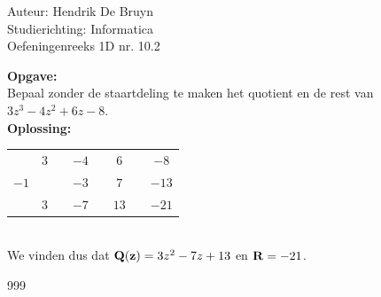 \documentclass[a4paper]{article}
\begin{document}
  
\noindent \large Auteur: Hendrik De Bruyn \\
\noindent \large Studierichting: Informatica\\
\noindent \large Oefeningenreeks 1D nr. 10.2\\

\medskip

\normalsize

\textbf{Opgave:} \\

Bepaal zonder de staartdeling te maken het quotient en de rest van $3z^3 - 4z^2 + 6z - 8$. \\

\textbf{Oplossing:} \\

\begin{tabular}{c|ccccccc}
         & $3$ && $-4$ && $6$  &      & $-8$  \\
    $-1$ &     && $-3$ && $7$  &      & $-13$ \\ \hline
         & $3$ && $-7$ && $13$ &\vline& $-21$ \\
\end{tabular} \\

We vinden dus dat ${\bf Q(z)} = 3z^2 - 7z + 13$ en ${\bf R} = -21$. \\

\begin{thebibliography}{999}
\end{thebibliography}
\end{document}
